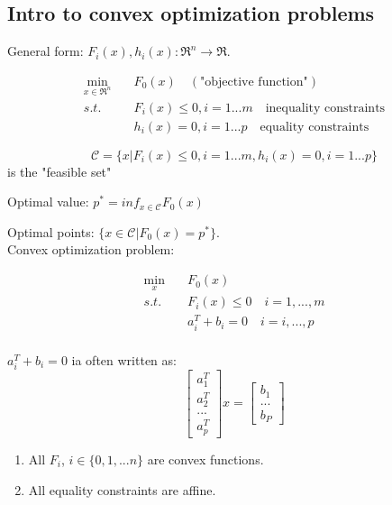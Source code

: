 \subsection{Intro to convex optimization problems}
General form: $F_i(x), h_i(x): \Re^n\rightarrow \Re$.

\begin{align*}
\min_{x\in \Re^n} \quad &F_0(x) \quad(\text{"objective function"})\\
s.t. \quad &F_i(x) \leq 0, i = 1...m \quad\text{inequality constraints}\\
&h_i(x) =0,i =1...p \quad \text{equality constraints}
\end{align*}


\begin{equation*}
\mathcal{C} = \{x\vert F_i(x) \leq 0,i=1...m,h_i(x) = 0,i = 1...p \}
\end{equation*}
is the "feasible set"

Optimal value: $p^* = inf_{x\in \mathcal{C}}F_0(x)$

Optimal points: $\{x\in \mathcal{C}\vert F_0(x) = p^* \}$.\\

Convex optimization problem: 

\begin{align*}
\min_x \quad &F_0(x) \\
s.t. &F_i(x)\leq 0 \quad i = 1,...,m\\
&a^T_i + b_i = 0\quad i =i,...,p\\
\end{align*}

$a^T_i + b_i = 0$ ia often written as:
\begin{equation*}
\begin{bmatrix}
a_1^T\\
a_2^T\\
...\\
a_p^T
\end{bmatrix}x = 
\begin{bmatrix}
b_1\\
...\\
b_P
\end{bmatrix}
\end{equation*}

\begin{enumerate}
	\item All $F_i$, $i\in \{0,1,...n \}$ are convex functions.
	
	\item All equality constraints are affine.
\end{enumerate}


